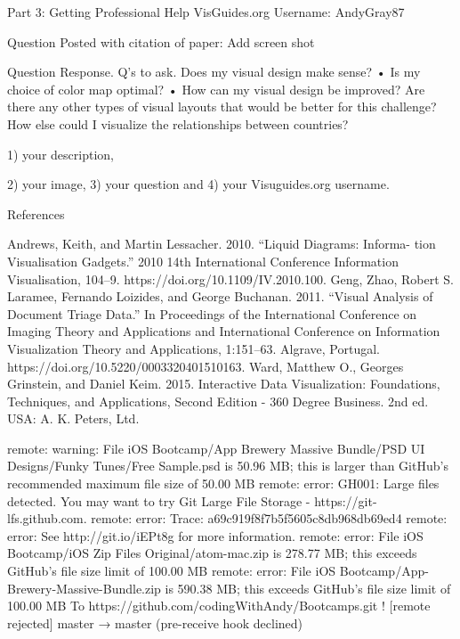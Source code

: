 Part 3: Getting Professional Help
VisGuides.org Username: AndyGray87
 
Question Posted with citation of paper: Add screen shot

Question Response.
Q’s to ask.
Does my visual design make sense?
• Is my choice of color map optimal?
• How can my visual design be improved? 
Are there any other types of visual layouts that would be better for this challenge? 
How else could I visualize the relationships between countries? 

1)	your description,

  
2) your image,
3) your question and
4) your Visuguides.org username. 

References

Andrews, Keith, and Martin Lessacher. 2010. “Liquid Diagrams: Informa- tion Visualisation Gadgets.” 2010 14th International Conference Information 
Visualisation, 104–9. https://doi.org/10.1109/IV.2010.100. Geng, Zhao, Robert S. Laramee, Fernando Loizides, and George Buchanan. 2011. 
“Visual Analysis of Document Triage Data.” In Proceedings of the International Conference on Imaging Theory and Applications and International Conference on Information Visualization Theory and Applications, 1:151–63. Algrave, Portugal. https://doi.org/10.5220/0003320401510163. 
Ward, Matthew O., Georges Grinstein, and Daniel Keim. 2015. Interactive Data Visualization: Foundations, Techniques, and Applications, Second Edition - 360 Degree Business. 2nd ed. USA: A. K. Peters, Ltd. 


remote: warning: File iOS Bootcamp/App Brewery Massive Bundle/PSD UI Designs/Funky Tunes/Free Sample.psd is 50.96 MB; this is larger than GitHub's recommended maximum file size of 50.00 MB        
remote: error: GH001: Large files detected. You may want to try Git Large File Storage - https://git-lfs.github.com.        
remote: error: Trace: a69c919f8f7b5f5605c8db968db69ed4        
remote: error: See http://git.io/iEPt8g for more information.        
remote: error: File iOS Bootcamp/iOS Zip Files Original/atom-mac.zip is 278.77 MB; this exceeds GitHub's file size limit of 100.00 MB        
remote: error: File iOS Bootcamp/App-Brewery-Massive-Bundle.zip is 590.38 MB; this exceeds GitHub's file size limit of 100.00 MB        
To https://github.com/codingWithAndy/Bootcamps.git
 ! [remote rejected] master → master (pre-receive hook declined)
